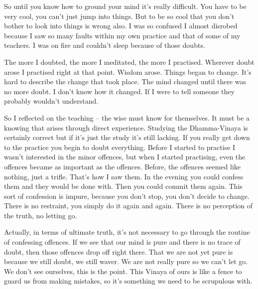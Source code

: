 So until you know how to ground your mind it's really difficult. You have to be very cool, you can't just jump into things. But to be so cool that you don't bother to look into things is wrong also. I was so confused I almost disrobed because I saw so many faults within my own practice and that of some of my teachers. I was on fire and couldn't sleep because of those doubts.

The more I doubted, the more I meditated, the more I practised. Wherever doubt arose I practised right at that point. Wisdom arose. Things began to change. It's hard to describe the change that took place. The mind changed until there was no more doubt. I don't know how it changed. If I were to tell someone they probably wouldn't understand.

So I reflected on the teaching  -- the wise must know for themselves. It must be a knowing that arises through direct experience. Studying the Dhamma-Vinaya is certainly correct but if it's just the study it's still lacking. If you really get down to the practice you begin to doubt everything. Before I started to practise I wasn't interested in the minor offences, but when I started practising, even the  offences became as important as the  offences. Before, the  offences seemed like nothing, just a trifle. That's how I saw them. In the evening you could confess them and they would be done with. Then you could commit them again. This sort of confession is impure, because you don't stop, you don't decide to change. There is no restraint, you simply do it again and again. There is no perception of the truth, no letting go.

Actually, in terms of ultimate truth, it's not necessary to go through the routine of confessing offences. If we see that our mind is pure and there is no trace of doubt, then those offences drop off right there. That we are not yet pure is because we still doubt, we still waver. We are not really pure so we can't let go. We don't see ourselves, this is the point. This Vinaya of ours is like a fence to guard us from making mistakes, so it's something we need to be scrupulous with.


